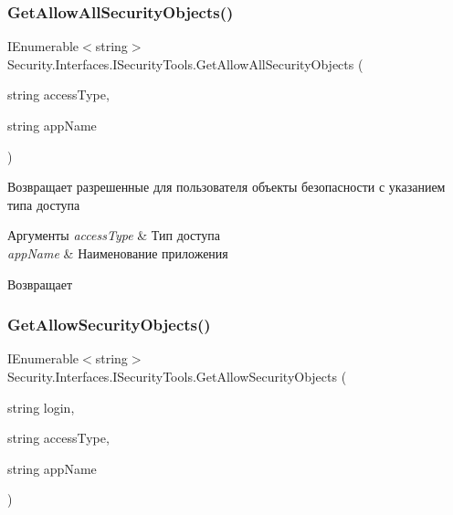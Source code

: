 \subsubsection{\texorpdfstring{Get\+Allow\+All\+Security\+Objects()}{GetAllowAllSecurityObjects()}}
{\footnotesize\ttfamily I\+Enumerable$<$string$>$ Security.\+Interfaces.\+I\+Security\+Tools.\+Get\+Allow\+All\+Security\+Objects (\begin{DoxyParamCaption}\item[{string}]{access\+Type,  }\item[{string}]{app\+Name }\end{DoxyParamCaption})}



Возвращает разрешенные для пользователя объекты безопасности с указанием типа доступа 


\begin{DoxyParams}{Аргументы}
{\em access\+Type} & Тип доступа\\
\hline
{\em app\+Name} & Наименование приложения\\
\hline
\end{DoxyParams}
\begin{DoxyReturn}{Возвращает}

\end{DoxyReturn}
\mbox{\label{interface_security_1_1_interfaces_1_1_i_security_tools_a6580f39f21207c7f2238a5b6a54fbddb}} 
\subsubsection{\texorpdfstring{Get\+Allow\+Security\+Objects()}{GetAllowSecurityObjects()}}
{\footnotesize\ttfamily I\+Enumerable$<$string$>$ Security.\+Interfaces.\+I\+Security\+Tools.\+Get\+Allow\+Security\+Objects (\begin{DoxyParamCaption}\item[{string}]{login,  }\item[{string}]{access\+Type,  }\item[{string}]{app\+Name }\end{DoxyParamCaption})}



